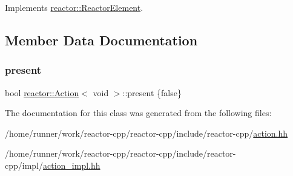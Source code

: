 Implements \hyperlink{classreactor_1_1ReactorElement_a8cb574cb20ff963903ad905fb0a157e3}{reactor\+::\+Reactor\+Element}.



\subsection{Member Data Documentation}
\mbox{\label{classreactor_1_1Action_3_01void_01_4_ad491b67ebfa70d65f04e6a0403a3cc51}} 
\subsubsection{\texorpdfstring{present}{present}}
{\footnotesize\ttfamily bool \hyperlink{classreactor_1_1Action}{reactor\+::\+Action}$<$ void $>$\+::present \{false\}\hspace{0.3cm}{\ttfamily [private]}}



The documentation for this class was generated from the following files\+:\begin{DoxyCompactItemize}
\item 
/home/runner/work/reactor-\/cpp/reactor-\/cpp/include/reactor-\/cpp/\hyperlink{action_8hh}{action.\+hh}\item 
/home/runner/work/reactor-\/cpp/reactor-\/cpp/include/reactor-\/cpp/impl/\hyperlink{action__impl_8hh}{action\+\_\+impl.\+hh}\end{DoxyCompactItemize}
